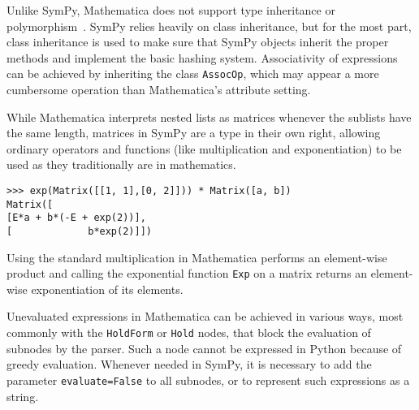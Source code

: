 

Unlike SymPy, Mathematica does not support type inheritance or poly\-morph\-ism~\cite{Fateman1992}.
%
SymPy relies heavily on class inheritance, but for the most part,
class inheritance is used to make sure that SymPy objects inherit the proper
methods and implement the basic hashing system.
Associativity of expressions can be achieved by inheriting the class \texttt{AssocOp},
which may appear a more cumbersome operation than Mathematica's attribute setting.


While Mathematica interprets nested lists as matrices whenever
the sublists have the same length, matrices in SymPy are a type in their own
right, allowing ordinary operators and functions (like multiplication and
exponentiation) to be used as they traditionally are in mathematics.
\begin{verbatim}
>>> exp(Matrix([[1, 1],[0, 2]])) * Matrix([a, b])
Matrix([
[E*a + b*(-E + exp(2))],
[             b*exp(2)]])
\end{verbatim}

Using the standard multiplication in Mathematica performs an element-wise
product and
calling the exponential function \texttt{Exp} on a matrix
returns an element-wise exponentiation of its elements.


Unevaluated expressions in Mathematica can be achieved in various ways,
most commonly with the \texttt{HoldForm} or \texttt{Hold} nodes,
that block the evaluation of subnodes by the parser.
Such a node cannot be expressed in Python because of greedy evaluation.
Whenever needed in SymPy, it is necessary to add the parameter \texttt{evaluate=False}
to all subnodes, or to represent such expressions as a string.


